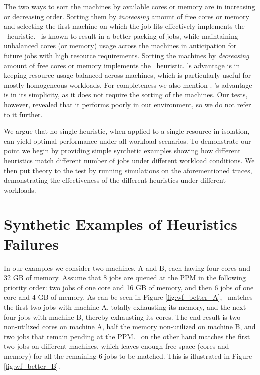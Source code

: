 The two ways to sort the machines by available cores or memory are in
increasing or decreasing order.
Sorting them by \textit{increasing} amount of free cores or memory and
selecting the first machine on which the job fits effectively
implements the \bef\ heuristic.
\bef\ is known to result in a better packing of jobs, while
maintaining unbalanced cores (or memory) usage across the machines in
anticipation for future jobs with high resource requirements.
Sorting the machines by \textit{decreasing} amount of free cores or
memory implements the \wof\ heuristic.
\wof's advantage is in keeping resource usage balanced across
machines, which is particularly useful for mostly-homogeneous
workloads.
For completeness we also mention \fif.
\fif's advantage is in its simplicity, as it does not require the
sorting of the machines.
Our tests, however, revealed that it performs poorly in our
environment, so we do not refer to it further.

We argue that no single heuristic, when applied to a single resource in
isolation, can yield optimal performance under all workload
scenarios.
To demonstrate our point we begin by providing simple synthetic examples
showing how different heuristics match different number of jobs under
different workload conditions.
We then put theory to the test by running simulations on the
aforementioned traces, demonstrating the effectiveness of the different heuristics 
under different workloads.


\section{Synthetic Examples of Heuristics Failures}

In our examples we consider two machines, A and B, each having four
cores and 32 GB of memory.
Assume that 8 jobs are queued at the PPM in the following priority order: two jobs
of one core and 16 GB of memory, and then 6 jobs of one core and 4 GB of
memory.
As can be seen in Figure \ref{fig:wf_better_A}, \bef\ matches the first
two jobs with machine A, totally exhausting its memory, and the next
four jobs with machine B, thereby exhausting its cores.
The end result is two non-utilized cores on machine A, half the memory
non-utilized on machine B, and two jobs that remain pending at the PPM.
\wof\ on the other hand matches the first two jobs on different
machines, which leaves enough free space (cores and memory) for all the
remaining 6 jobs to be matched.
This is illustrated in Figure \ref{fig:wf_better_B}.

